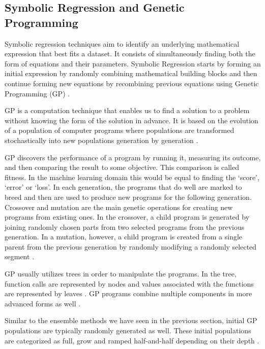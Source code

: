 \documentclass[journal]{IEEEtran}
\begin{document}
\vspace{-0.3cm}
\subsection{Symbolic Regression and Genetic Programming}
\label{section:GeneticProgramming}
Symbolic regression techniques aim to identify an underlying mathematical expression that best fits a dataset. It consists of simultaneously finding both the form of equations and their parameters. Symbolic Regression starts by forming an initial expression by randomly combining mathematical building blocks and then continue forming new equations by recombining previous equations using Genetic Programming (GP) \cite{schmidt2010symbolic}.

GP is a computation technique that enables us to find a solution to a problem without knowing the form of the solution in advance. It is based on the evolution of a population of computer programs where populations are transformed stochastically into new populations generation by generation \cite{poli2008field}.

GP discovers the performance of a program by running it, measuring its outcome, and then comparing the result to some objective. This comparison is called fitness. In the machine learning domain this would be equal to finding the ‘score’, ‘error’ or ‘loss’. In each generation, the programs that do well are marked to breed and then are used to produce new programs for the following generation. Crossover and mutation are the main genetic operations for creating new programs from existing ones. In the crossover, a child program is generated by joining randomly chosen parts from two selected programs from the previous generation. In a mutation, however, a child program is created from a single parent from the previous generation by randomly modifying a randomly selected segment \cite{poli2008field}.

GP usually utilizes trees in order to manipulate the programs. In the tree, function calls are represented by nodes and values associated with the functions are represented by leaves \cite{koza1992genetic}. GP programs combine multiple components in more advanced forms as well \cite{poli2008field}.

Similar to the ensemble methods we have seen in the previous section, initial GP populations are typically randomly generated as well. These initial populations are categorized as full, grow and ramped half-and-half depending on their depth \cite{poli2008field}.
\end{document}
